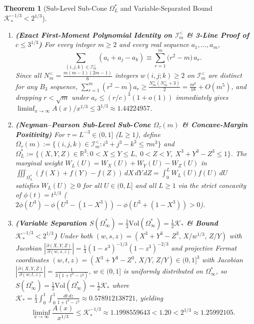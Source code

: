 \documentclass[11pt,a4paper]{article}
\newtheorem{theorem}{Theorem}[section]
\theoremstyle{remark}
\begin{document}
\begin{theorem}[Sub-Level Sub-Cone $\Omega_L^*$ and Variable-Separated Bound $\mathcal{K}_*^{-1/3} < 2^{1/3}$]
\begin{enumerate}
  \item \textbf{(Exact First-Moment Polynomial Identity on $\mathcal{I}_m^{<}$ \& 3-Line Proof of $c \le 3^{1/3}$)} For every integer $m \ge 2$ and every real sequence $a_1, \dots, a_m$,
  \[
    \sum_{(i, j, k) \in \mathcal{I}_m^{<}} (a_i + a_j - a_k) \equiv \sum_{r=1}^m \bigl(r^2 - m\bigr)\, a_r.
  \]
  Since all $N_m^{<} = \frac{m(m-1)(2m-1)}{6}$ integers $w(i, j; k) \ge 2$ on $\mathcal{I}_m^{<}$ are distinct for any $B_3$ sequence, $\sum_{r=1}^m (r^2 - m) a_r \ge \frac{N_m^{<}(N_m^{<}+3)}{2} = \frac{m^6}{18} + O(m^5)$, and dropping $r < \sqrt{m}$ under $a_r \le (r/c)^3(1+o(1))$ immediately gives $\liminf_{x\to\infty} A(x)/x^{1/3} \le 3^{1/3} \approx 1.44224957$.
  \item \textbf{(Neyman--Pearson Sub-Level Sub-Cone $\Omega_\tau(m)$ \& Concave-Margin Positivity)} For $\tau = L^{-3} \in (0, 1]$ ($L \ge 1$), define $\Omega_\tau(m) := \{(i, j, k) \in \mathcal{I}_m^{<} : i^3 + j^3 - k^3 \le \tau m^3\}$ and $\Omega_L^* := \{(X, Y, Z) \in \mathbb{R}^3 : 0 < X \le Y \le L,\; 0 < Z < Y,\; X^3 + Y^3 - Z^3 \le 1\}$. The marginal weight $W_L(U) = W_X(U) + W_Y(U) - W_Z(U)$ in $\iiint_{\Omega_L^*} (f(X)+f(Y)-f(Z))\,dX\,dY\,dZ = \int_0^L W_L(U) f(U)\,dU$ satisfies $W_L(U) \ge 0$ for all $U \in (0, L]$ and all $L \ge 1$ via the strict concavity of $\phi(t) = t^{1/3}$ ($2\phi(U^3) - \phi(U^3-(1-X^3)) - \phi(U^3+(1-X^3)) > 0$).
  \item \textbf{(Variable Separation $S(\Omega_\infty^*) = \frac{1}{2}\mathrm{Vol}(\Omega_\infty^*) = \frac{1}{2}\mathcal{K}_*$ \& Bound $\mathcal{K}_*^{-1/3} < 2^{1/3}$)} Under both $(w, s, z) = (X^3+Y^3-Z^3,\, X/w^{1/3},\, Z/Y)$ with Jacobian $|\frac{\partial(X,Y,Z)}{\partial(w,s,z)}| = \frac{1}{3}(1-s^3)^{-1/3}(1-z^3)^{-2/3}$ and projective Fermat coordinates $(w, t, z) = (X^3+Y^3-Z^3,\, X/Y,\, Z/Y) \in (0, 1]^3$ with Jacobian $|\frac{\partial(X,Y,Z)}{\partial(w,t,z)}| = \frac{1}{3(1+t^3-z^3)}$, $w \in (0, 1]$ is uniformly distributed on $\Omega_\infty^*$, so $S(\Omega_\infty^*) = \frac{1}{2}\mathrm{Vol}(\Omega_\infty^*) = \frac{1}{2}\mathcal{K}_*$ where $\mathcal{K}_* = \frac{1}{3}\int_0^1\int_0^1 \frac{dt\,dz}{1+t^3-z^3} \approx 0.578912138721$, yielding
  \[
    \liminf_{x\to\infty} \frac{A(x)}{x^{1/3}} \le \mathcal{K}_*^{-1/3} \approx 1.1998559643 < 1.20 < 2^{1/3} \approx 1.25992105.
  \]
\end{enumerate}
\end{theorem}
\end{document}
